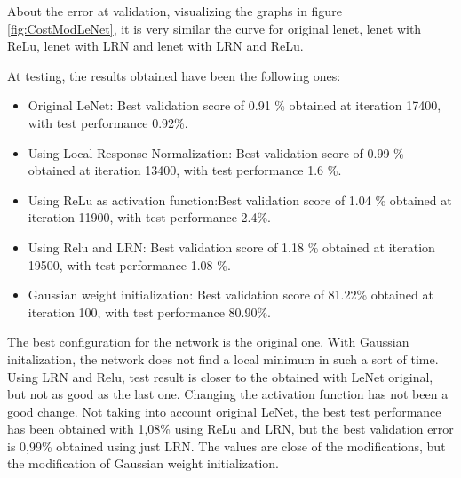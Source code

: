 About the error at validation, visualizing the graphs in figure \ref{fig:CostModLeNet}, it is very similar the curve for original lenet, lenet with ReLu, lenet with LRN and lenet with LRN and ReLu. 

At testing, the results obtained have been the following ones:

\begin{itemize}
\item{Original LeNet}: Best validation score of 0.91 \% obtained at iteration 17400, with test performance 0.92\%.
\item{Using Local Response Normalization}: Best validation score of 0.99 \% obtained at iteration 13400, with test performance 1.6 \%.
\item{Using ReLu as activation function}:Best validation score of 1.04 \% obtained at iteration 11900, with test performance 2.4\%.
\item{Using Relu and LRN}: Best validation score of 1.18 \% obtained at iteration 19500, with test performance 1.08 \%.
\item{Gaussian weight initialization}: Best validation score of 81.22\% obtained at iteration 100, with test performance 80.90\%.
\end{itemize}


The best configuration for the network is the original one. With Gaussian initalization, the network does not find a local minimum in such a sort of time. Using LRN and Relu, test result is closer to the obtained with LeNet original, but not as good as the last one. Changing the activation function has not been a good change. Not taking into account original LeNet, the best test performance has been obtained with 1,08\% using ReLu and LRN, but the best validation error is 0,99\% obtained using just LRN. The values are close of the modifications, but the modification of Gaussian weight initialization.\\ 

\clearpage